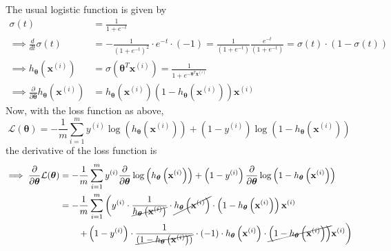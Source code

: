The usual logistic function is given by
\begin{align*}
    \sigma\left(t\right)
     & =
    \frac{1}{1+e^{-t}}
    \\
    \implies
    \frac{d}{dt} \sigma\left(t\right)
     & =
    -\frac{1}{{\left(1+e^{-t}\right)}^2} \cdot e^{-t} \cdot (-1)
    =
    \frac{1}{\left(1+e^{-t}\right)}
    \frac{e^{-t}}{\left(1+e^{-t}\right)}
    =
    \sigma\left(t\right) \cdot \left(1-\sigma\left(t\right)\right)
    \\
    \implies
    h_{\boldsymbol{\theta}}\left(\mathbf{x}^{(i)}\right)
     & =
    \sigma\left(\boldsymbol{\theta}^{T} \mathbf{x}^{(i)}\right)
    =
    \frac{1}{1+e^{-\boldsymbol{\theta}^{T} \mathbf{x}^{(i)}}}
    \\
    \implies
    \frac{\partial}{\partial \boldsymbol{\theta}} h_{\boldsymbol{\theta}}\left(\mathbf{x}^{(i)}\right)
     & =
    h_{\boldsymbol{\theta}}\left(\mathbf{x}^{(i)}\right) \left(1-h_{\boldsymbol{\theta}}\left(\mathbf{x}^{(i)}\right)\right) \mathbf{x}^{(i)}
\end{align*}
Now, with the loss function as above,
\begin{equation*}
    \mathcal{L}(\boldsymbol{\theta})
    =
    -\frac{1}{m} \sum_{i=1}^{m}
    y^{(i)} \log \left(h_{\boldsymbol{\theta}}\left(\mathbf{x}^{(i)}\right)\right)
    +
    \left(1-y^{(i)}\right) \log \left(1-h_{\boldsymbol{\theta}}\left(\mathbf{x}^{(i)}\right)\right)
\end{equation*}
the derivative of the loss function is
\begin{align*}
    \implies
    \frac{\partial}{\partial \boldsymbol{\theta}} \mathcal{L}(\boldsymbol{\theta})
     & =
    -\frac{1}{m} \sum_{i=1}^{m}
    y^{(i)} \frac{\partial}{\partial \boldsymbol{\theta}} \log \left(h_{\boldsymbol{\theta}}\left(\mathbf{x}^{(i)}\right)\right)
    +
    \left(1-y^{(i)}\right) \frac{\partial}{\partial \boldsymbol{\theta}} \log \left(1-h_{\boldsymbol{\theta}}\left(\mathbf{x}^{(i)}\right)\right)
    \\ & =
    -\frac{1}{m} \sum_{i=1}^{m}
    \left(
    y^{(i)}
    \cdot \frac{1}{\cancel{h_{\boldsymbol{\theta}}\left(\mathbf{x}^{(i)}\right)}}
    \cdot \cancel{h_{\boldsymbol{\theta}}\left(\mathbf{x}^{(i)}\right)}
    \cdot \left(1-h_{\boldsymbol{\theta}}\left(\mathbf{x}^{(i)}\right)\right)
    \mathbf{x}^{(i)}
    \right.
    \\ & \qquad
    \left.
    +
    \left(1-y^{(i)}\right)
    \cdot \frac{1}{\cancel{(1-h_{\boldsymbol{\theta}}\left(\mathbf{x}^{(i)}\right))}}
    \cdot (-1)
    \cdot h_{\boldsymbol{\theta}}\left(\mathbf{x}^{(i)}\right)
    \cdot \cancel{\left(1-h_{\boldsymbol{\theta}}\left(\mathbf{x}^{(i)}\right)\right)}
    \mathbf{x}^{(i)}
    \right)
\end{align*}
